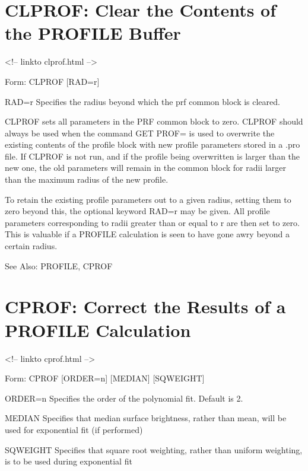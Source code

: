 \section{CLPROF: Clear the Contents of the PROFILE Buffer}
\begin{rawhtml}
<!-- linkto clprof.html -->
\end{rawhtml}
\begin{command}
  \item[Form: CLPROF {[RAD=r]}\hfill]{}
  \item[RAD=r]{Specifies the radius beyond which the prf common
       block is cleared.}
\end{command}

CLPROF sets all parameters in the PRF common block to zero. CLPROF should
always be used when the command GET PROF= is used to overwrite the existing
contents of the profile block with new profile parameters stored in a .pro
file. If CLPROF is not run, and if the profile being overwritten is larger
than the new one, the old parameters will remain in the common block for
radii larger than the maximum radius of the new profile.

To retain the existing profile parameters out to a given radius, setting
them to zero beyond this, the optional keyword RAD=r may be given. All
profile parameters corresponding to radii greater than or equal to r are
then set to zero. This is valuable if a PROFILE calculation is seen to have
gone awry beyond a certain radius.

See Also: PROFILE, CPROF


\section{CPROF: Correct the Results of a PROFILE Calculation}
\begin{rawhtml}
<!-- linkto cprof.html -->
\end{rawhtml}
\begin{command}
  \item[Form: CPROF {[ORDER=n]} {[MEDIAN]} {[SQWEIGHT]}\hfill]{}
  \item[ORDER=n]{Specifies the order of the polynomial fit. Default is 2.}
  \item[MEDIAN]{Specifies that median surface brightness, rather
       than mean, will be used for exponential fit (if performed)}
  \item[SQWEIGHT]{Specifies that square root weighting, rather than 
       uniform weighting, is to be used during exponential fit}
\end{command}

